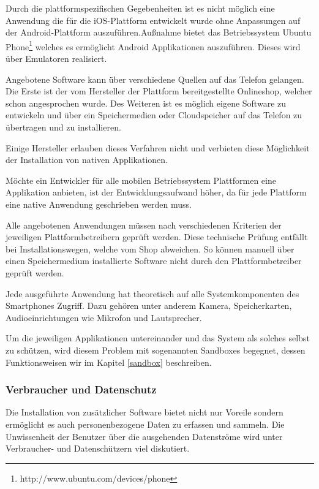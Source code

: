Durch die plattformspezifischen Gegebenheiten ist es nicht möglich eine Anwendung die für die iOS-Plattform entwickelt wurde ohne Anpassungen auf der Android-Plattform auszuführen.Außnahme bietet das Betriebssystem Ubuntu Phone\footnote{http://www.ubuntu.com/devices/phone} welches es ermöglicht Android Applikationen auszuführen. Dieses wird über Emulatoren realisiert. 

Angebotene Software kann über verschiedene Quellen auf das Telefon gelangen. Die Erste ist der vom Hersteller der Plattform bereitgestellte Onlineshop, welcher schon angesprochen wurde. Des Weiteren ist es möglich eigene Software zu entwickeln und über ein Speichermedien oder Cloudspeicher auf das Telefon zu übertragen und zu installieren.

Einige Hersteller erlauben dieses Verfahren nicht und verbieten diese Möglichkeit der Installation von nativen Applikationen.

Möchte ein Entwickler für alle mobilen Betriebssystem Plattformen eine Applikation anbieten, ist der Entwicklungsaufwand höher, da für jede Plattform eine native Anwendung geschrieben werden muss.

Alle angebotenen Anwendungen müssen nach verschiedenen Kriterien der jeweiligen Plattformbetreibern geprüft werden. Diese technische Prüfung entfällt bei Installationswegen, welche vom Shop abweichen. So können manuell über einen Speichermedium installierte Software nicht durch den Plattformbetreiber geprüft werden.

Jede ausgeführte Anwendung hat theoretisch auf alle Systemkomponenten des Smartphones Zugriff. Dazu gehören unter anderem Kamera, Speicherkarten, Audioeinrichtungen wie Mikrofon und Lautsprecher.

Um die jeweiligen Applikationen untereinander und das System als solches selbst zu schützen, wird diesem Problem mit sogenannten Sandboxes begegnet, dessen Funktionsweisen wir im Kapitel \ref{sandbox} beschreiben.

\subsubsection{Verbraucher und Datenschutz}

Die Installation von zusätzlicher Software bietet nicht nur Voreile sondern ermöglicht es auch personenbezogene Daten zu erfassen und sammeln. Die Unwissenheit der Benutzer über die ausgehenden Datenströme wird unter Verbraucher- und Datenschützern viel diskutiert.

